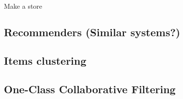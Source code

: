 Make a store















\subsection{Recommenders (Similar systems?)}
\subsection{Items clustering}
\subsection{One-Class Collaborative Filtering}





